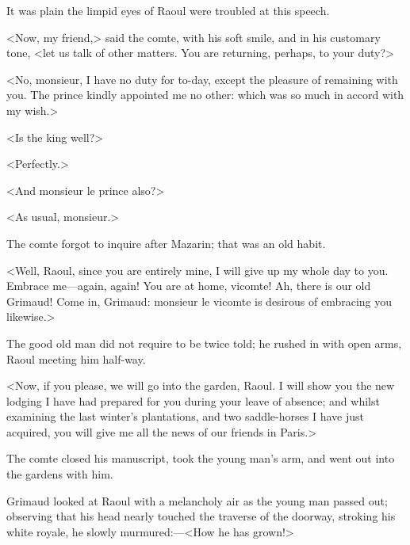 It was plain the limpid eyes of Raoul were troubled at this speech.

<Now, my friend,> said the comte, with his soft smile, and in his customary tone, <let us talk of other matters. You are returning, perhaps, to your duty?>

<No, monsieur, I have no duty for to-day, except the pleasure of remaining with you. The prince kindly appointed me no other: which was so much in accord with my wish.>

<Is the king well?>

<Perfectly.>

<And monsieur le prince also?>

<As usual, monsieur.>

The comte forgot to inquire after Mazarin; that was an old habit.

<Well, Raoul, since you are entirely mine, I will give up my whole day to you. Embrace me—again, again! You are at home, vicomte! Ah, there is our old Grimaud! Come in, Grimaud: monsieur le vicomte is desirous of embracing you likewise.>

The good old man did not require to be twice told; he rushed in with open arms, Raoul meeting him half-way.

<Now, if you please, we will go into the garden, Raoul. I will show you the new lodging I have had prepared for you during your leave of absence; and whilst examining the last winter's plantations, and two saddle-horses I have just acquired, you will give me all the news of our friends in Paris.>

The comte closed his manuscript, took the young man's arm, and went out into the gardens with him.

Grimaud looked at Raoul with a melancholy air as the young man passed out; observing that his head nearly touched the traverse of the doorway, stroking his white royale, he slowly murmured:—<How he has grown!> 